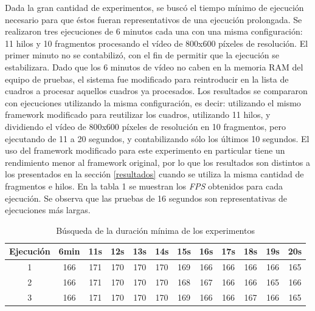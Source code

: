 Dada la gran cantidad de experimentos, se buscó el tiempo mínimo de ejecución
necesario para que éstos fueran representativos de una ejecución prolongada. Se
realizaron tres ejecuciones de 6 minutos cada una con una misma configuración:
11 hilos y 10 fragmentos procesando el vídeo de 800x600 píxeles de resolución.
El primer minuto no se contabilizó, con el fin de permitir que la ejecución se
estabilizara. Dado que los 6 minutos de vídeo no caben en la memoria RAM del
equipo de pruebas, el sistema fue modificado para reintroducir en la lista de
cuadros a procesar aquellos cuadros ya procesados. Los resultados se compararon
con ejecuciones utilizando la misma configuración, es decir: utilizando el mismo
framework modificado para reutilizar los cuadros, utilizando 11 hilos, y
dividiendo el vídeo de 800x600 píxeles de resolución en 10 fragmentos, pero
ejecutando de 11 a 20 segundos, y contabilizando sólo los últimos 10 segundos.
El uso del framework modificado para este experimento en particular tiene un
rendimiento menor al framework original, por lo que los resultados son distintos
a los presentados en la sección \ref{resultados} cuando se utiliza la misma
cantidad de fragmentos e hilos. En la tabla 1 se muestran los \emph{FPS}
obtenidos para cada ejecución. Se observa que las pruebas de 16 segundos son
representativas de ejecuciones más largas.

\begin{table}[h]
	\centering
	\begin{tabular}{c||c|c|c|c|c|c|c|c|c|c|c}

		Ejecución&6min&11s&12s&13s&14s&15s&16s&17s&18s&19s&20s\\

		\hline
		\hline

		1&166& 171& 170& 170& 170& 169& 166& 166& 166& 166& 165\\

		\hline

		2&166& 171& 170& 170& 170& 168& 167& 166& 166& 165& 166\\

		\hline

		3&166& 171& 170& 170& 170& 169& 166& 166& 167& 166& 165

	\end{tabular}

	\caption{Búsqueda de la duración mínima de los experimentos}

\label{tabla}

\end{table}

